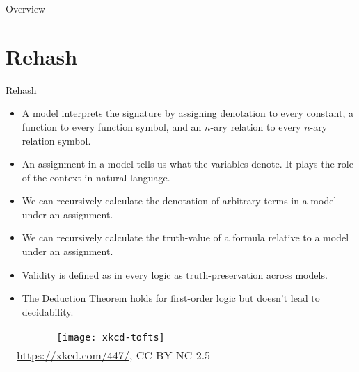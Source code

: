 \setcounter{framenumber}{304}
\begin{frame}
  \maketitle
\end{frame}

\begin{frame}{Overview}
\tableofcontents
\end{frame}

\section{Rehash}
\begin{frame}{Rehash}
	
\begin{itemize}
	
		\item \alert{A model interprets the signature by assigning denotation to every constant, a function to every function symbol, and an $n$-ary relation to every $n$-ary relation symbol.}
		
		\item An assignment in a model tells us what the variables denote. It plays the role of the context in natural language. 
	
		\item We can recursively calculate the denotation of arbitrary terms in a model under an assignment.
		
		\item We can recursively calculate the truth-value of a formula relative to a model under an assignment.
		
		\item Validity is defined as in every logic as truth-preservation across models.
		
		\item \alert{The Deduction Theorem holds for first-order logic but doesn't lead to decidability.}
										
	\end{itemize}

\end{frame}

\begin{frame}


	
	\begin{center}
		\begin{tabular}{c}
		\texttt{[image: xkcd-tofts]}\\[-1ex]
		{\tiny \textcopyright~\url{https://xkcd.com/447/}, CC BY-NC 2.5}
		\end{tabular}
		\end{center}

\end{frame}
		

